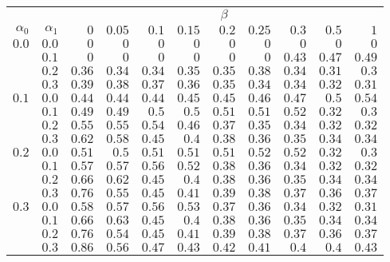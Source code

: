\begin{tabular}{rr|rrrrrrrrr}
\hline\hline
 && \multicolumn{9}{c}{$\beta$}\\
 $\alpha_0$ & $\alpha_1$ & $0$ & $0.05$ & $0.1$ & $0.15$ & $0.2$ & $0.25$ & $0.3$ & $0.5$ & $1$ \\ 
 \hline
$0.0$ & $0.0$ & $0$ & $0$ & $0$ & $0$ & $0$ & $0$ & $0$ & $0$ & $0$\\ 
 & $0.1$ & $0$ & $0$ & $0$ & $0$ & $0$ & $0$ & $0.43$ & $0.47$ & $0.49$\\ 
 & $0.2$ & $0.36$ & $0.34$ & $0.34$ & $0.35$ & $0.35$ & $0.38$ & $0.34$ & $0.31$ & $0.3$\\ 
 & $0.3$ & $0.39$ & $0.38$ & $0.37$ & $0.36$ & $0.35$ & $0.34$ & $0.34$ & $0.32$ & $0.31$\\ 
\hline 
 $0.1$ & $0.0$ & $0.44$ & $0.44$ & $0.44$ & $0.45$ & $0.45$ & $0.46$ & $0.47$ & $0.5$ & $0.54$\\ 
 & $0.1$ & $0.49$ & $0.49$ & $0.5$ & $0.5$ & $0.51$ & $0.51$ & $0.52$ & $0.32$ & $0.3$\\ 
 & $0.2$ & $0.55$ & $0.55$ & $0.54$ & $0.46$ & $0.37$ & $0.35$ & $0.34$ & $0.32$ & $0.32$\\ 
 & $0.3$ & $0.62$ & $0.58$ & $0.45$ & $0.4$ & $0.38$ & $0.36$ & $0.35$ & $0.34$ & $0.34$\\ 
\hline 
 $0.2$ & $0.0$ & $0.51$ & $0.5$ & $0.51$ & $0.51$ & $0.51$ & $0.52$ & $0.52$ & $0.32$ & $0.3$\\ 
 & $0.1$ & $0.57$ & $0.57$ & $0.56$ & $0.52$ & $0.38$ & $0.36$ & $0.34$ & $0.32$ & $0.32$\\ 
 & $0.2$ & $0.66$ & $0.62$ & $0.45$ & $0.4$ & $0.38$ & $0.36$ & $0.35$ & $0.34$ & $0.34$\\ 
 & $0.3$ & $0.76$ & $0.55$ & $0.45$ & $0.41$ & $0.39$ & $0.38$ & $0.37$ & $0.36$ & $0.37$\\ 
\hline 
 $0.3$ & $0.0$ & $0.58$ & $0.57$ & $0.56$ & $0.53$ & $0.37$ & $0.36$ & $0.34$ & $0.32$ & $0.31$\\ 
 & $0.1$ & $0.66$ & $0.63$ & $0.45$ & $0.4$ & $0.38$ & $0.36$ & $0.35$ & $0.34$ & $0.34$\\ 
 & $0.2$ & $0.76$ & $0.54$ & $0.45$ & $0.41$ & $0.39$ & $0.38$ & $0.37$ & $0.36$ & $0.37$\\ 
 & $0.3$ & $0.86$ & $0.56$ & $0.47$ & $0.43$ & $0.42$ & $0.41$ & $0.4$ & $0.4$ & $0.43$\\ 
 \hline 
 \end{tabular}